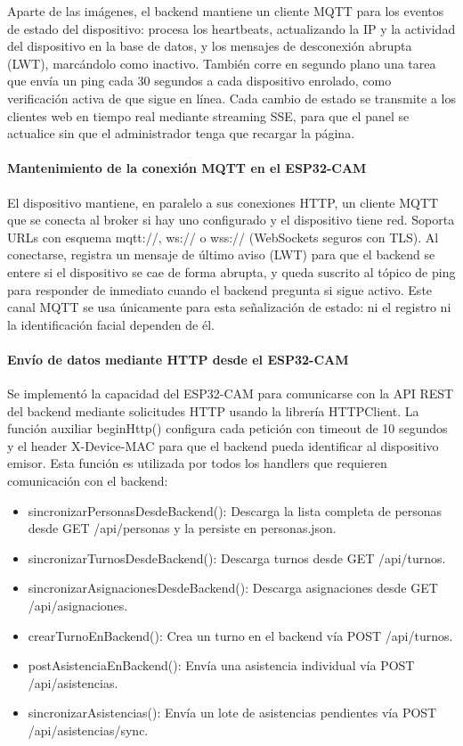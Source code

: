 Aparte de las imágenes, el backend mantiene un cliente MQTT para los eventos de estado del dispositivo: procesa los heartbeats, actualizando la IP y la actividad del dispositivo en la base de datos, y los mensajes de desconexión abrupta (LWT), marcándolo como inactivo. También corre en segundo plano una tarea que envía un ping cada 30 segundos a cada dispositivo enrolado, como verificación activa de que sigue en línea. Cada cambio de estado se transmite a los clientes web en tiempo real mediante streaming SSE, para que el panel se actualice sin que el administrador tenga que recargar la página.

\paragraph{Mantenimiento de la conexión MQTT en el ESP32-CAM}

El dispositivo mantiene, en paralelo a sus conexiones HTTP, un cliente MQTT que se conecta al broker si hay uno configurado y el dispositivo tiene red. Soporta URLs con esquema mqtt://, ws:// o wss:// (WebSockets seguros con TLS). Al conectarse, registra un mensaje de último aviso (LWT) para que el backend se entere si el dispositivo se cae de forma abrupta, y queda suscrito al tópico de ping para responder de inmediato cuando el backend pregunta si sigue activo. Este canal MQTT se usa únicamente para esta señalización de estado: ni el registro ni la identificación facial dependen de él.

\paragraph{Envío de datos mediante HTTP desde el ESP32-CAM}

Se implementó la capacidad del ESP32-CAM para comunicarse con la API REST del backend mediante solicitudes HTTP usando la librería HTTPClient. La función auxiliar beginHttp() configura cada petición con timeout de 10 segundos y el header X-Device-MAC para que el backend pueda identificar al dispositivo emisor. Esta función es utilizada por todos los handlers que requieren comunicación con el backend:

\begin{itemize}
    \item sincronizarPersonasDesdeBackend(): Descarga la lista completa de personas desde GET /api/personas y la persiste en personas.json.
    \item sincronizarTurnosDesdeBackend(): Descarga turnos desde GET /api/turnos.
    \item sincronizarAsignacionesDesdeBackend(): Descarga asignaciones desde GET /api/asignaciones.
    \item crearTurnoEnBackend(): Crea un turno en el backend vía POST /api/turnos.
    \item postAsistenciaEnBackend(): Envía una asistencia individual vía POST /api/asistencias.
    \item sincronizarAsistencias(): Envía un lote de asistencias pendientes vía POST /api/asistencias/sync.
\end{itemize}

